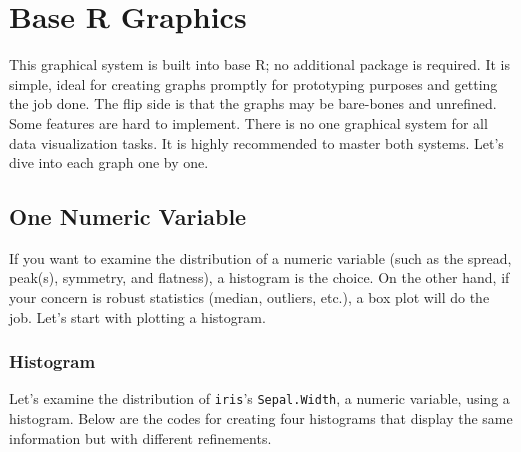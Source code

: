 \documentclass[
  letterpaper,
  DIV=11,
  numbers=noendperiod]{scrreprt}
\begin{document}
\section{Base R Graphics}\label{base-r-graphics}

This graphical system is built into base R; no additional package is
required. It is simple, ideal for creating graphs promptly for
prototyping purposes and getting the job done. The flip side is that the
graphs may be bare-bones and unrefined. Some features are hard to
implement. There is no one graphical system for all data visualization
tasks. It is highly recommended to master both systems. Let's dive into
each graph one by one.

\subsection{One Numeric Variable}\label{one-numeric-variable}

If you want to examine the distribution of a numeric variable (such as
the spread, peak(s), symmetry, and flatness), a histogram is the choice.
On the other hand, if your concern is robust statistics (median,
outliers, etc.), a box plot will do the job. Let's start with plotting a
histogram.

\subsubsection{Histogram}\label{histogram}

Let's examine the distribution of \texttt{iris}'s \texttt{Sepal.Width},
a numeric variable, using a histogram. Below are the codes for creating
four histograms that display the same information but with different
refinements.
\end{document}
